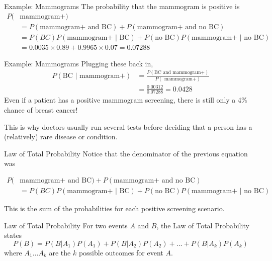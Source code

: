 \begin{frame}{Example: Mammograms}
    The probability that the mammogram is positive is
    \small\begin{align*}
        P(&\text{mammogram+}) \\ 
        &=P(\text{mammogram+ and BC}) + P(\text{mammogram+ and no BC}) \\
        &= P(BC)P(\text{mammogram+ }|\text{ BC}) + P(\text{no BC})P(\text{mammogram+ }|\text{ no BC}) \\
        &= 0.0035 \times 0.89 + 0.9965 \times 0.07 = 0.07288
    \end{align*}
\end{frame}

\begin{frame}{Example: Mammograms}
    Plugging these back in,
    \begin{align*}
        P(\text{BC } | \text{ mammogram+}) &= \frac{P(\text{BC and mammogram+})}{P(\text{ mammogram+})} \\
        &= \frac{0.00312}{0.07288} = 0.0428
    \end{align*}
    Even if a patient has a positive mammogram screening, there is still only a 4\% chance of breast cancer!
    
    \vspace{12pt}This is why doctors usually run several tests before deciding that a person has a (relatively) rare disease or condition.
\end{frame}

\begin{frame}{Law of Total Probability}
    Notice that the denominator of the previous equation was
    \begin{small}\begin{align*}
        P(&\text{mammogram+ and BC}) + P(\text{mammogram+ and no BC}) \\
        &= P(BC)P(\text{mammogram+ }|\text{ BC}) + P(\text{no BC})P(\text{mammogram+ }|\text{ no BC})
    \end{align*}\end{small}
    This is the sum of the probabilities for each positive screening scenario.
\end{frame}

\begin{frame}{Law of Total Probability}
    For two events $A$ and $B$, the Law of Total Probability states
    \[
    P(B) = P(B|A_1)P(A_1)+P(B|A_2)P(A_2)+\dots +P(B|A_k)P(A_k)
    \]
    where $A_1 \dots A_k$ are the $k$ possible outcomes for event $A$.
\end{frame}

